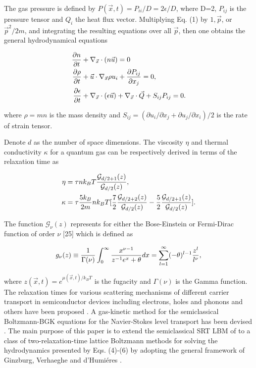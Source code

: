 \documentclass[doublecol]{epl2}
\begin{document}
The gas pressure is defined by $P(\vec x, t) = P_{i i}/D = 2 \epsilon /D$, where D=2, $P_{ij}$ is the pressure tensor and $Q_{i}$ the heat flux vector.
Multiplying Eq. (1) by $1, \vec p$, or $\vec p^2/2m$, and integrating the resulting equations over all $\vec p$, then one obtains the general hydrodynamical equations

\begin{align}
{ \partial n \over \partial t} &+ \nabla_{\vec x} \cdot (n \vec u) = 0 \\
{ \partial \rho \over \partial t} &+ \vec u \cdot \nabla_{\vec x} \rho u_{i} + {\partial P_{ij} \over \partial x_{j} } = 0, \\
{\partial \epsilon \over \partial t} &+ \nabla_{\vec x} \cdot (\epsilon \vec u) + \nabla_{\vec x} \cdot \vec Q + S_{ij} P_{ij} = 0.
\end{align}

where $\rho=m n$ is the mass density and $S_{ij}=(\partial u_{i}/\partial x_{j} + \partial u_{j}/\partial x_{i})/2$ is the rate of strain tensor.

Denote $d$ as the number of space dimensions. The viscosity $\eta$ and thermal conductivity $\kappa$ for a quantum gas can be respectively derived in terms of the relaxation time as

\begin{align}
\eta &= \tau n  k_B T {\mathcal{G}_{d/2+1}(z) \over \mathcal{G}_{d/2}(z) }, \\
\kappa &= \tau {5 k_B \over 2m} n k_B T [{7 \over 2}{\mathcal{G}_{d/2+2}(z) \over \mathcal{G}_{d/2}(z) } -{5 \over 2}{\mathcal{G}_{d/2+1}(z) \over \mathcal{G}_{d/2}(z)}].
\end{align}

The function $\mathcal{G}_{\nu}(z)$ represents for either the Bose-Einstein or Fermi-Dirac function of order $\nu$ [25] which is defined as

\begin{align}
g_{\nu}(z) \equiv {1 \over \Gamma(\nu)} \int^{\infty}_0 { x^{\nu
-1} \over {z^{-1} e^x + \theta}}dx = \sum^{\infty}_{l=1}
(-\theta)^{l-1} {z^l \over l^{\nu}},
\end{align}

where $z(\vec x, t)= e^{ \mu(\vec x, t) /k_B T }$ is the fugacity and $\Gamma(\nu)$ is the Gamma function. The relaxation times for various scattering mechanisms of different carrier transport in semiconductor devices including electrons, holes and phonons and others have been proposed \cite{Lund2000, Chen2005}. A gas-kinetic method for the semiclassical Boltzmann-BGK equations for the Navier-Stokes level transport has been devised \cite{Shi2008}. The main purpose of this paper is to extend the semiclassical SRT LBM of \cite{Yang2009} to a class of two-relaxation-time lattice Boltzmann methods for solving the hydrodynamics presented by Eqs. (4)-(6) by adopting the general framework of Ginzburg, Verhaeghe and d'Humi\'{e}res \cite{Trt2008a, Trt2008b}.
\end{document}
